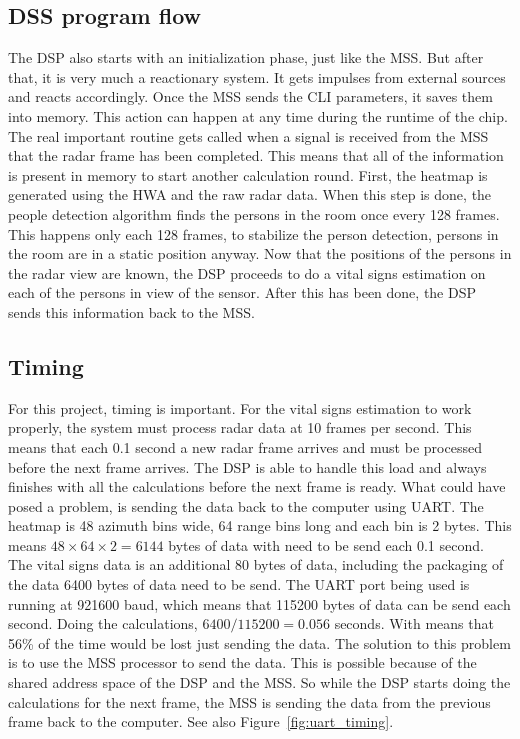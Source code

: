 \subsection{DSS program flow}
The DSP also starts with an initialization phase, just like the MSS. But after that, it is very much a reactionary system. It gets impulses from external sources and reacts accordingly. Once the MSS sends the CLI parameters, it saves them into memory. This action can happen at any time during the runtime of the chip. The real important routine gets called when a signal is received from the MSS that the radar frame has been completed. This means that all of the information is present in memory to start another calculation round. First, the heatmap is generated using the HWA and the raw radar data. When this step is done, the people detection algorithm finds the persons in the room once every 128 frames. This happens only each 128 frames, to stabilize the person detection, persons in the room are in a static position anyway. Now that the positions of the persons in the radar view are known, the DSP proceeds to do a vital signs estimation on each of the persons in view of the sensor. After this has been done, the DSP sends this information back to the MSS.

\subsection{Timing}
For this project, timing is important. For the vital signs estimation to work properly, the system must process radar data at 10 frames per second. This means that each 0.1 second a new radar frame arrives and must be processed before the next frame arrives. The DSP is able to handle this load and always finishes with all the calculations before the next frame is ready. What could have posed a problem, is sending the data back to the computer using UART. The heatmap is 48 azimuth bins wide, 64 range bins long and each bin is 2 bytes. This means $48 \times 64 \times 2 = 6144$ bytes of data with need to be send each 0.1 second. The vital signs data is an additional 80 bytes of data, including the packaging of the data 6400 bytes of data need to be send. The UART port being used is running at 921600 baud, which means that 115200 bytes of data can be send each second. Doing the calculations, $6400 / 115200 = 0.056$ seconds. With means that 56\% of the time would be lost just sending the data. The solution to this problem is to use the MSS processor to send the data. This is possible because of the shared address space of the DSP and the MSS. So while the DSP starts doing the calculations for the next frame, the MSS is sending the data from the previous frame back to the computer. See also Figure~\ref{fig:uart_timing}.

